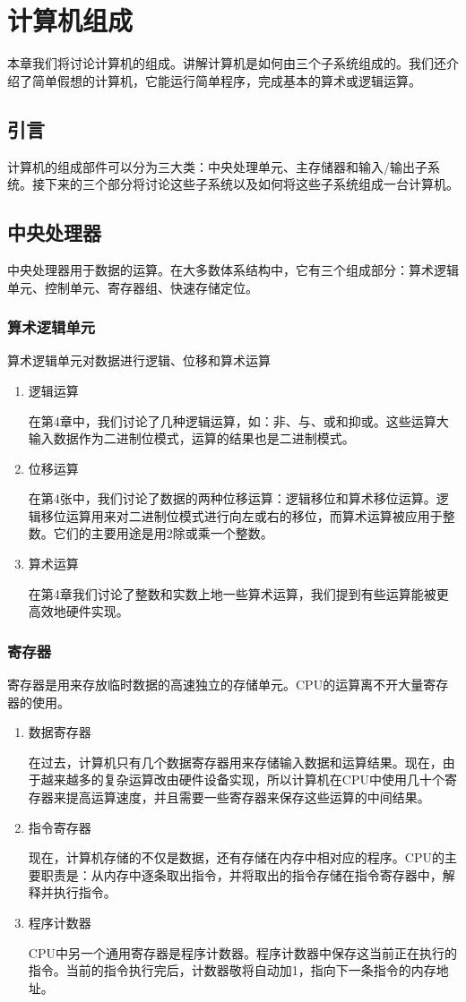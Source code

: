 \chapter{计算机组成}
本章我们将讨论计算机的组成。讲解计算机是如何由三个子系统组成的。我们还介绍了简单假想的计算机，它能运行简单程序，完成基本的算术或逻辑运算。

\section{引言}
计算机的组成部件可以分为三大类：中央处理单元、主存储器和输入/输出子系统。接下来的三个部分将讨论这些子系统以及如何将这些子系统组成一台计算机。
\section{中央处理器}
中央处理器用于数据的运算。在大多数体系结构中，它有三个组成部分：算术逻辑单元、控制单元、寄存器组、快速存储定位。
\subsection{算术逻辑单元}
算术逻辑单元对数据进行逻辑、位移和算术运算
\begin{enumerate}
	\item 逻辑运算

	在第4章中，我们讨论了几种逻辑运算，如：非、与、或和抑或。这些运算大输入数据作为二进制位模式，运算的结果也是二进制模式。
	\item 位移运算

	在第4张中，我们讨论了数据的两种位移运算：逻辑移位和算术移位运算。逻辑移位运算用来对二进制位模式进行向左或右的移位，而算术运算被应用于整数。它们的主要用途是用2除或乘一个整数。
	\item 算术运算

	在第4章我们讨论了整数和实数上地一些算术运算，我们提到有些运算能被更高效地硬件实现。
\end{enumerate}
\subsection{寄存器}
寄存器是用来存放临时数据的高速独立的存储单元。CPU的运算离不开大量寄存器的使用。
\begin{enumerate}
	\item 数据寄存器

	在过去，计算机只有几个数据寄存器用来存储输入数据和运算结果。现在，由于越来越多的复杂运算改由硬件设备实现，所以计算机在CPU中使用几十个寄存器来提高运算速度，并且需要一些寄存器来保存这些运算的中间结果。
	\item 指令寄存器 

	现在，计算机存储的不仅是数据，还有存储在内存中相对应的程序。CPU的主要职责是：从内存中逐条取出指令，并将取出的指令存储在指令寄存器中，解释并执行指令。

	\item 程序计数器

	CPU中另一个通用寄存器是程序计数器。程序计数器中保存这当前正在执行的指令。当前的指令执行完后，计数器敬将自动加1，指向下一条指令的内存地址。
\end{enumerate}
